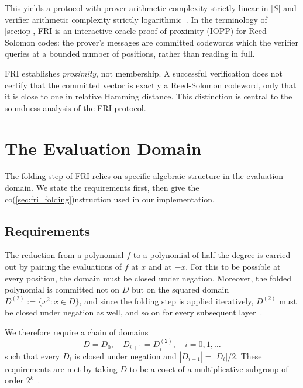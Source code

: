 This yields a protocol with prover arithmetic complexity strictly
linear in $|S|$ and verifier arithmetic complexity strictly
logarithmic~\cite[Section~2.1]{BBHR18}. In the terminology of
\cref{sec:iop}, FRI is an interactive oracle proof of proximity (IOPP)
for Reed-Solomon codes: the prover's messages are committed
codewords which the verifier queries at a bounded number of positions,
rather than reading in full.
 
\begin{remark}
\label{rem:proximity_not_membership}
FRI establishes \emph{proximity}, not membership. A successful
verification does not certify that the committed vector is exactly a
Reed-Solomon codeword, only that it is close to one in relative
Hamming distance. This distinction is central to the soundness
analysis of the FRI protocol.
\end{remark}  %
 

 
\section{The Evaluation Domain}
\label{sec:fri_domain}
 
The folding step of FRI relies on specific algebraic structure in the
evaluation domain. We state the requirements first, then give the
co(\cref{sec:fri_folding})nstruction used in our implementation.
 
 
\subsection{Requirements}
\label{subsec:domain_requirements}
 
The reduction from a polynomial $f$ to a polynomial of half the degree
is carried out by pairing the evaluations of $f$ at $x$ and at $-x$. %
For this to be possible at every position,
the domain must be closed under negation. Moreover, the folded
polynomial is committed not on $D$ but on the squared domain
$D^{(2)} := \{x^2 : x \in D\}$, and since the folding step is applied
iteratively, $D^{(2)}$ must be closed under negation as well, and so
on for every subsequent layer~\cite[Section~3.9.1]{ethSTARK}.
 
We therefore require a chain of domains
%
\[
D = D_0, \quad D_{i+1} = D_i^{(2)}, \quad i = 0, 1, \ldots
\]
%
such that every $D_i$ is closed under negation and
$|D_{i+1}| = |D_i|/2$. These requirements are met by taking $D$ to be
a coset of a multiplicative subgroup of order
$2^k$~\cite[Section~3.9.1]{ethSTARK}.
 

